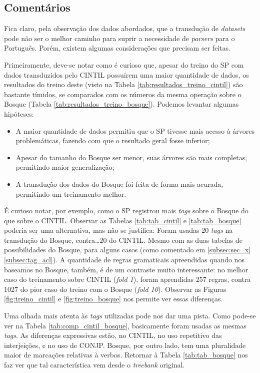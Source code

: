 \subsection{Comentários}
\label{subsec:result_coment}

Fica claro, pela observação dos dados abordados, que a transdução de \textit{datasets} pode não ser o melhor caminho para suprir a necessidade de \textit{parsers} para o Português. Porém, existem algumas considerações que precisam ser feitas.

Primeiramente, deve-se notar como é curioso que, apesar do treino do SP com dados transduzidos pelo CINTIL possuírem uma maior quantidade de dados, os resultados do treino deste (visto na Tabela \ref{tab:resultados_treino_cintil}) são bastante tímidos, se comparados com os números da mesma operação sobre o Bosque (Tabela \ref{tab:resultados_treino_bosque}). Podemos levantar algumas hipóteses: 
\begin{itemize}
    \item A maior quantidade de dados permitiu que o SP tivesse mais acesso à árvores problemáticas, fazendo com que o resultado geral fosse inferior;
    \item Apesar do tamanho do Bosque ser menor, suas árvores são mais completas, permitindo maior generalização;
    \item A transdução dos dados do Bosque foi feita de forma mais acurada, permitindo um treinamento melhor.
\end{itemize}
É curioso notar, por exemplo, como o SP registrou mais \textit{tags} sobre o Bosque do que sobre o CINTIL. Observar as Tabelas \ref{tab:tab_cintil} e \ref{tab:tab_bosque} poderia ser uma alternativa, mas não se justifica: Foram usadas 20 \textit{tags} na transdução do Bosque, contra\ldots 20 do CINTIL. Mesmo com as duas tabelas de possibilidades do Bosque, para alguns casos (como comentado em \ref{subsec:sec_x} \ref{subsec:tag_acl}). A quantidade de regras gramaticais apreendidas quando nos baseamos no Bosque, também, é de um contraste muito interessante: no melhor caso do treinamento sobre CINTIL (\textit{fold 1}), foram aprendidas 257 regras, contra 1027 do pior caso do treino com o Bosque (\textit{fold 10}). Observar as Figuras \ref{fig:treino_cintil} e \ref{fig:treino_bosque} nos permite ver essas diferenças.

Uma olhada mais atenta às \textit{tags} utilizadas pode nos dar uma pista. Como pode-se ver na Tabela \ref{tab:comp_cintil_bosque}, basicamente foram usadas as mesmas \textit{tags}. As diferenças expressivas estão, no CINTIL, no uso repetitivo das interjeições, e no uso de CONJP. Bosque, por outro lado, tem uma pluralidade maior de marcações relativas à verbos. Retornar à Tabela \ref{tab:tab_bosque} nos faz ver que tal característica vem desde o \textit{treebank} original. 
\begin{center}
    
\end{center}

